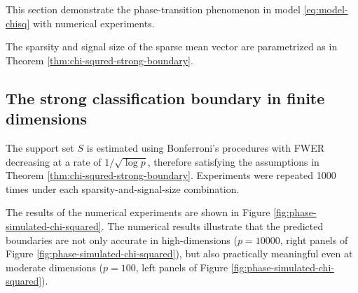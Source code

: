 This section demonstrate the phase-transition phenomenon in model \eqref{eq:model-chisq} with numerical experiments.

The sparsity and signal size of the sparse mean vector are parametrized as in Theorem \ref{thm:chi-squred-strong-boundary}.

\subsection{The strong classification boundary in finite dimensions}

The support set $S$ is estimated using Bonferroni's procedures with FWER decreasing at a rate of $1/\sqrt{\log{p}}$, therefore satisfying the assumptions in Theorem \ref{thm:chi-squred-strong-boundary}.
Experiments were repeated 1000 times under each sparsity-and-signal-size combination.

The results of the numerical experiments are shown in Figure \ref{fig:phase-simulated-chi-squared}.
The numerical results illustrate that the predicted boundaries are not only accurate in high-dimensions ($p=10000$, right panels of Figure \ref{fig:phase-simulated-chi-squared}), but also practically meaningful even at moderate dimensions ($p=100$, left panels of Figure \ref{fig:phase-simulated-chi-squared}).


